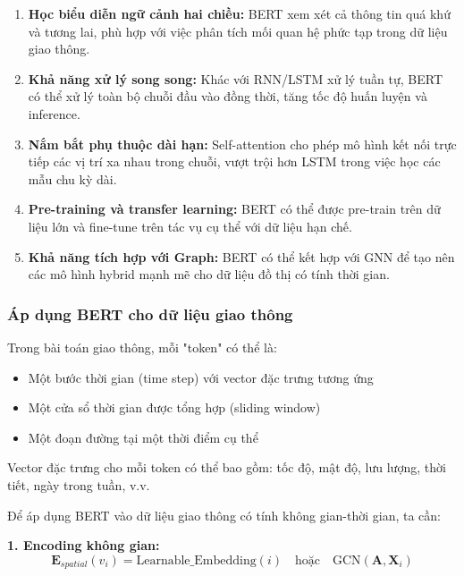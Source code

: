 \begin{enumerate}
    \item \textbf{Học biểu diễn ngữ cảnh hai chiều:} BERT xem xét cả thông tin quá khứ và tương lai, phù hợp với việc phân tích mối quan hệ phức tạp trong dữ liệu giao thông.

    \item \textbf{Khả năng xử lý song song:} Khác với RNN/LSTM xử lý tuần tự, BERT có thể xử lý toàn bộ chuỗi đầu vào đồng thời, tăng tốc độ huấn luyện và inference.

    \item \textbf{Nắm bắt phụ thuộc dài hạn:} Self-attention cho phép mô hình kết nối trực tiếp các vị trí xa nhau trong chuỗi, vượt trội hơn LSTM trong việc học các mẫu chu kỳ dài.

    \item \textbf{Pre-training và transfer learning:} BERT có thể được pre-train trên dữ liệu lớn và fine-tune trên tác vụ cụ thể với dữ liệu hạn chế.

    \item \textbf{Khả năng tích hợp với Graph:} BERT có thể kết hợp với GNN để tạo nên các mô hình hybrid mạnh mẽ cho dữ liệu đồ thị có tính thời gian.
\end{enumerate}

\subsubsection{Áp dụng BERT cho dữ liệu giao thông}


Trong bài toán giao thông, mỗi "token" có thể là:
\begin{itemize}
    \item Một bước thời gian (time step) với vector đặc trưng tương ứng
    \item Một cửa sổ thời gian được tổng hợp (sliding window)
    \item Một đoạn đường tại một thời điểm cụ thể
\end{itemize}

Vector đặc trưng cho mỗi token có thể bao gồm: tốc độ, mật độ, lưu lượng, thời tiết, ngày trong tuần, v.v.


Để áp dụng BERT vào dữ liệu giao thông có tính không gian-thời gian, ta cần:

\textbf{1. Encoding không gian:}
\begin{equation}
\mathbf{E}_{spatial}(v_i) = \text{Learnable\_Embedding}(i) \quad \text{hoặc} \quad \text{GCN}(\mathbf{A}, \mathbf{X}_i)
\end{equation}


